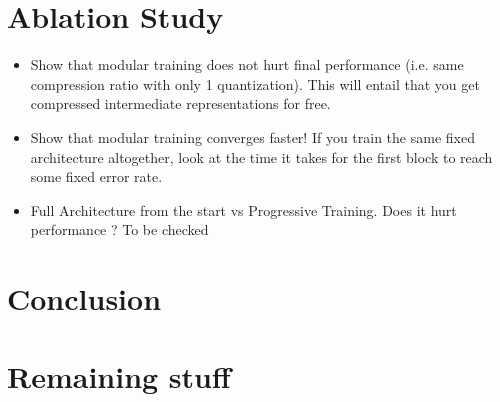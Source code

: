 \documentclass[colorinlistoftodos]{article} %
\begin{document}



\section{Ablation Study}
\begin{itemize}
    \item Show that modular training does not hurt final performance (i.e. same compression ratio with only 1 quantization). This will entail that you get compressed intermediate representations for free. 
    \item Show that modular training converges faster! If you train the same fixed architecture altogether, look at the time it takes for the first block to reach some fixed error rate. 
    \item Full Architecture from the start vs Progressive Training. Does it hurt performance ? To be checked
\end{itemize}

\section{Conclusion}

\clearpage
\section{Remaining stuff}
\end{document}
